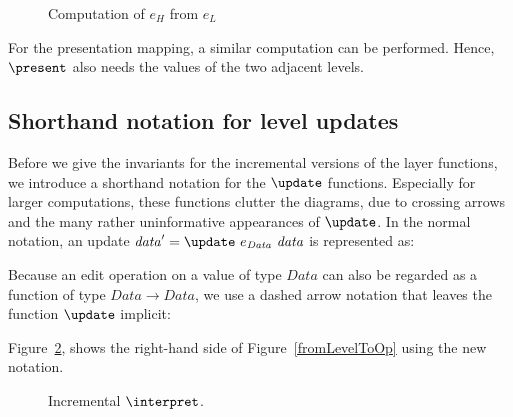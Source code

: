 \begin{figure}
\begin{small}
\begin{center}
\begin{center}
\end{center}\caption{Computation of $e_{H}$ from $e_{L}$}\label{computeOps} 
\end{center}
\end{small}
\end{figure}

For the presentation mapping, a similar computation can be performed. Hence, $\present$ also needs the values of the two adjacent levels. 


%																
\subsection{Shorthand notation for level updates}

Before we give the invariants for the incremental versions of the layer functions, we introduce a shorthand notation for the $\update$ functions. Especially for larger computations, these functions clutter the diagrams, due to crossing arrows and the many rather uninformative appearances of $\update$. In the normal notation, an update $\mathit{data}' = \update~e_{\mathit{Data}}~\mathit{data}$ is represented as:\\


\smallskip
Because an edit operation on a value of type $\mathit{Data}$ can also be regarded as a function of type 
$\mathit{Data} \rightarrow \mathit{Data}$, we use a dashed arrow notation that leaves the function $\update$ implicit:\\


Figure~\ref{incrementalInterpret}, shows the right-hand side of Figure~\ref{fromLevelToOp} using the new notation.

\begin{figure}
\begin{small}
\begin{center}
\begin{center}
\end{center}\caption{Incremental $\interpret$.}\label{incrementalInterpret} 
\end{center}
\end{small}
\end{figure}


